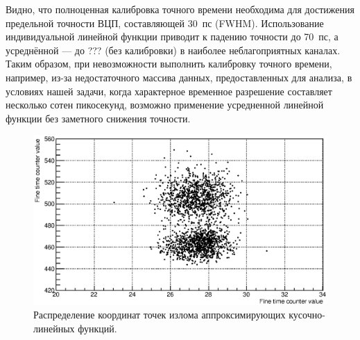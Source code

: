 Видно, что полноценная калибровка точного времени необходима для достижения предельной точности ВЦП, составляющей 30~пс (FWHM). Использование индивидуальной линейной функции приводит к падению точности до 70~пс, а усреднённой --- до ??? (без калибровки) в наиболее неблагоприятных каналах.
Таким образом, при невозможности выполнить калибровку точного времени, например, из-за недостаточного массива данных, предоставленных для анализа, в условиях нашей задачи, когда характерное временное разрешение составляет несколько сотен пикосекунд, возможно применение усредненной линейной функции без заметного снижения точности.

\begin{figure}
\includegraphics[width=1.0\textwidth]{pictures/ABmap.eps}
\caption{Распределение координат точек излома аппроксимирующих кусочно-линейных функций.}
\label{fig:ABmap}
\end{figure}


